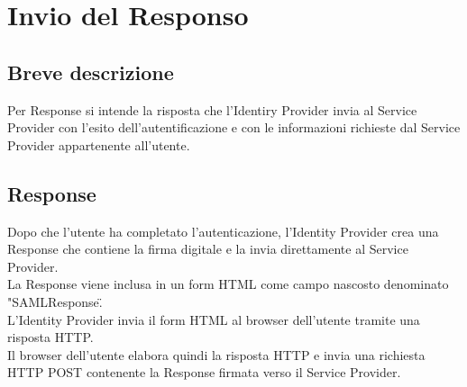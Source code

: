 \section{Invio del Responso}
\subsection{Breve descrizione}
Per Response si intende la risposta che l'Identiry Provider invia al Service Provider con 
l'esito dell'autentificazione e con le informazioni richieste dal Service Provider appartenente all'utente.
\subsection{Response}
Dopo che l'utente ha completato l'autenticazione, l'Identity Provider crea una Response che contiene la firma digitale e la invia 
direttamente al Service Provider.
\\ La Response viene inclusa in un form HTML come campo nascosto denominato "SAMLResponse\glo\". 
\\ L’Identity Provider invia il form HTML al browser dell’utente tramite una risposta
HTTP.
\\ Il browser dell’utente elabora quindi la risposta HTTP e invia una richiesta HTTP POST
contenente la Response firmata verso il Service Provider.